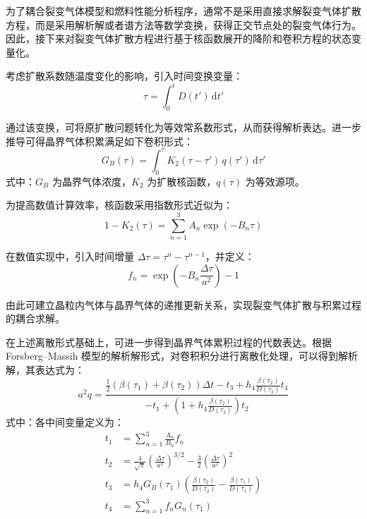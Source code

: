 为了耦合裂变气体模型和燃料性能分析程序，通常不是采用直接求解裂变气体扩散方程，而是采用解析解或者谱方法等数学变换，获得正交节点处的裂变气体行为。因此，接下来对裂变气体扩散方程进行基于核函数展开的降阶和卷积方程的状态变量化。

考虑扩散系数随温度变化的影响，引入时间变换变量：
\begin{equation}
	\tau = \int_0^t D(t') \, \mathrm{d}t'
\end{equation}

通过该变换，可将原扩散问题转化为等效常系数形式，从而获得解析表达。进一步推导可得晶界气体积累满足如下卷积形式：
\begin{equation}
	G_B(\tau) = \int_0^\tau K_2(\tau - \tau')\, q(\tau')\, \mathrm{d}\tau'
\end{equation}
\noindent 式中：$G_B$ 为晶界气体浓度，$K_2$ 为扩散核函数，$q(\tau)$ 为等效源项。

为提高数值计算效率，核函数采用指数形式近似为：
\begin{equation}
	1 - K_2(\tau) = \sum_{n=1}^{3} A_n \exp(-B_n \tau)
\end{equation}

在数值实现中，引入时间增量 $\Delta\tau = \tau^{n} - \tau^{n-1}$，并定义：
\begin{equation}
	f_n = \exp\left(-B_n \frac{\Delta\tau}{a^2}\right) - 1
\end{equation}

由此可建立晶粒内气体与晶界气体的递推更新关系，实现裂变气体扩散与积累过程的耦合求解。

在上述离散形式基础上，可进一步得到晶界气体累积过程的代数表达。根据 Forsberg--Massih 模型的解析解形式，对卷积积分进行离散化处理，可以得到解析解，其表达式为：
\begin{equation}
	a^2q =
	\frac{
		\frac{1}{2}\left(\beta(\tau_1)+\beta(\tau_2)\right)\Delta t
		- t_3
		+ h_4 \frac{\beta(\tau_2)}{D(\tau_2)} t_4
	}{
		- t_1 + \left(1 + h_4 \frac{\beta(\tau_2)}{D(\tau_2)}\right) t_2
	}
\end{equation}
\noindent 式中：各中间变量定义为：
\begin{align}
	t_1 & = \sum_{n=1}^{3} \frac{A_n}{B_n} f_n                                                            \\
	t_2 & = \frac{4}{\sqrt{\pi}}\left(\frac{\Delta\tau}{a^2}\right)^{3/2}
	- \frac{3}{2}\left(\frac{\Delta\tau}{a^2}\right)^2                                                    \\
	t_3 & = h_4 G_B(\tau_1)\left(\frac{\beta(\tau_2)}{D(\tau_2)} - \frac{\beta(\tau_1)}{D(\tau_1)}\right) \\
	t_4 & = \sum_{n=1}^{3} f_n G_n(\tau_1)
\end{align}

